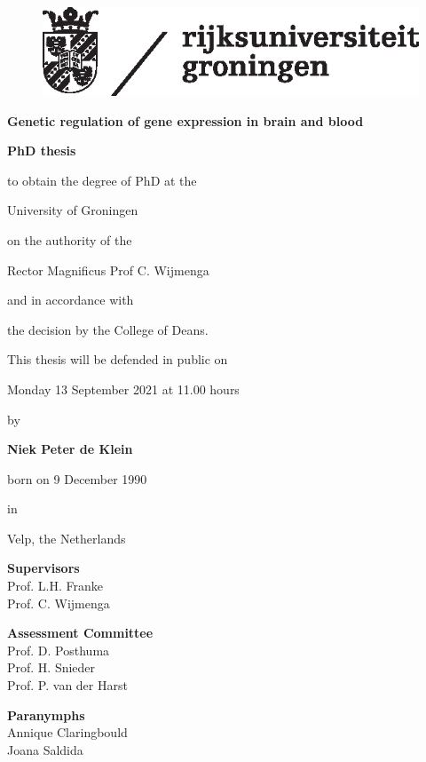 
\begin{figure}[H]
	\includegraphics{img/rugr_logonl_zwart_cmyk.eps}
\end{figure}


\huge \textbf{Genetic regulation of gene expression in brain and blood}
\large
\vspace{2.5cm}
\\
\centerline{\textbf{ PhD thesis}}
\normalsize
\vspace{0.5cm}

\centerline{to obtain the degree of PhD at the}
\centerline{University of Groningen}
\centerline{on the authority of the}
\centerline{Rector Magnificus Prof C. Wijmenga}
\centerline{and in accordance with}
\centerline{the decision by the College of Deans.}
\vspace{0.2cm}
\centerline{This thesis will be defended in public on}
\vspace{0.2cm}
\centerline{Monday 13 September 2021 at 11.00 hours }
\vspace{0.5cm}
\centerline{by}
\vspace{0.5cm}
\centerline{\textbf{Niek Peter de Klein}}
\centerline{born on 9 December 1990}
\centerline{in}
\centerline{Velp, the Netherlands}

\newpage
\textbf{Supervisors} \\
Prof. L.H. Franke \\
Prof. C. Wijmenga

\textbf{Assessment Committee} \\
Prof. D. Posthuma \\
Prof. H. Snieder
\\
Prof. P. van der Harst

\newpage
\textbf{Paranymphs} \\
Annique Claringbould \\
Joana Saldida

\clearpage